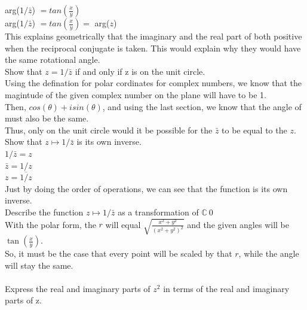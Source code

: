 \documentclass[12pt]{article}
\begin{document}
arg($1/\bar{z}$) $= tan(\frac{x}{y})$\\
arg($1/\bar{z}$) $= tan(\frac{x}{y}) =$ arg($z$) \\

This explains geometrically that the imaginary and the real part of both positive when the reciprocal conjugate is taken. 
This would explain why they would have the same rotational angle.\\

 Show that $z = 1/\bar{z}$ if and only if z is on the unit circle.\\

Using the defination for polar cordinates for complex numbers, we know that the magintude of the given complex number on the plane will have to be 1.\\
Then, $cos(\theta) + isin(\theta)$, and using the last section, we know that the angle of must also be the same.\\

Thus, only on the unit circle would it be possible for the $\bar{z}$ to be equal to the $z$.\\ 

 Show that $z \mapsto 1/\bar{z}$ is its own inverse.\\

$1/\bar{z} = z$\\
$\bar{z} = 1/z$\\
$z = \overline{1/z}$\\

Just by doing the order of operations, we can see that the function is its own inverse.\\


 Describe the function $z \mapsto 1/\bar{z}$ as a transformation of $\mathbb{C} \ {0} $\\

With the polar form, the $r$ will equal $\sqrt{\frac{x^2+y^2}{(x^2+y^2)^2}}$ and the given angles will be $\tan(\frac{x}{y})$.\\
So, it must be the case that every point will be scaled by that $r$, while the angle will stay the same.\\


\\

 Express the real and imaginary parts of $z^2$ in terms of the real and imaginary parts of z.\\
\end{document}
